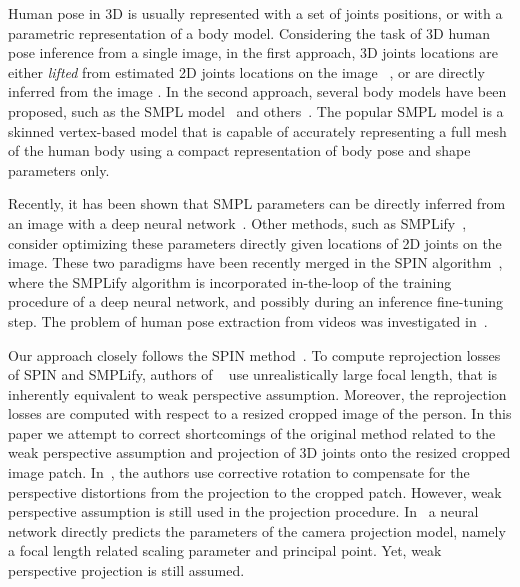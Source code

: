 \documentclass[runningheads]{llncs}
\begin{document}
Human pose in 3D is usually represented with a set of joints positions, or with a parametric representation of a body model. Considering the task of 3D human pose inference from a single image, in the first approach, 3D joints locations are either \emph{lifted} from estimated 2D joints locations on the image ~\cite{Chen2019Unsupervised3P,martinez2017simple,moreno20173d,zhao2017simple}, 
or are directly inferred from the image  \cite{nibali20193d,sarandi2020metric}. In the second approach, several body models have been proposed, such as the SMPL model~\cite{loper2015smpl} and others~\cite{anguelov2005scape,joo2018total}. The popular SMPL model is a skinned vertex-based model that is capable of accurately representing a full mesh of the human body using a compact representation of body pose and shape parameters only.

 Recently, it has been shown that SMPL parameters can be directly inferred from an image with a deep neural network~\cite{kanazawa2018end,omran2018nbf,pavlakos2018humanshape,tsungNIPS2017_7108,varol18_bodynet}. Other methods, such as SMPLify~\cite{bogo2016keep}, consider optimizing these parameters directly given locations of 2D joints on the image. These two paradigms have been recently merged in the SPIN algorithm~\cite{kolotouros2019convolutional}, where the SMPLify algorithm is incorporated in-the-loop of the training procedure of a deep neural network, and possibly during an inference fine-tuning step. The problem of human pose extraction from videos was investigated in~\cite{arnab2019exploiting,humanMotionKanazawa19,kocabas2020vibe,alldieck2018video,mehta2020xnect}. 
 
 Our approach closely follows the SPIN method~\cite{kolotouros2019convolutional}.  To compute reprojection losses of SPIN and SMPLify, authors of ~\cite{kolotouros2019convolutional}  use unrealistically large focal length, that is inherently equivalent to weak perspective assumption.  Moreover, the reprojection losses are computed with respect to a resized cropped image of the person. In this paper we attempt to correct shortcomings of the original method related to the weak perspective assumption and projection of 3D joints onto the resized cropped image patch.  In~\cite{mono-3dhp2017}, the authors use corrective rotation to compensate for the perspective distortions from the projection to the cropped patch. However, weak perspective assumption is still used in the projection procedure.
In~\cite{habibie2019wild}  a neural network directly predicts the parameters of the camera projection model, namely a focal length related scaling parameter and principal point. Yet, weak perspective projection is still assumed. 
\end{document}
